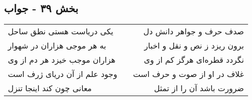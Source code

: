 \begin{center}
\section*{بخش ۳۹ - جواب}
\label{sec:sh039}
\begin{longtable}{l p{0.5cm} r}
یکی دریاست هستی نطق ساحل
&&
صدف حرف و جواهر دانش دل
\\
به هر موجی هزاران در شهوار
&&
برون ریزد ز نص و نقل و اخبار
\\
هزاران موجب خیزد هر دم از وی
&&
نگردد قطره‌ای هرگز کم از وی
\\
وجود علم از آن دریای ژرف است
&&
غلاف در او از صوت و حرف است
\\
معانی چون کند اینجا تنزل
&&
ضرورت باشد آن را از تمثل
\\
\end{longtable}
\end{center}
